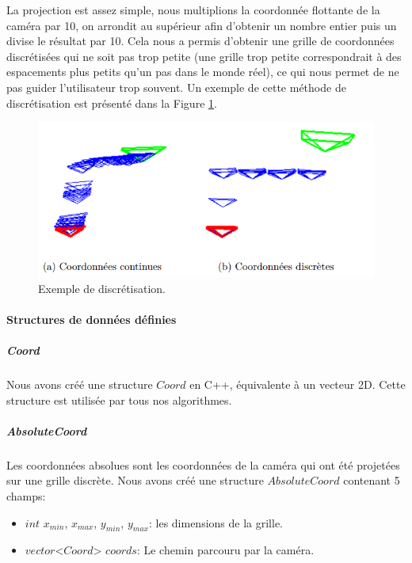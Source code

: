 \documentclass[11pt]{article}
\begin{document}
         La projection est assez simple, nous multiplions la coordonnée flottante de la caméra par 10, on arrondit au supérieur afin d'obtenir
         un nombre entier puis un divise le résultat par 10. Cela nous a permis d'obtenir une grille de coordonnées discrétisées qui ne soit
         pas trop petite (une grille trop petite correspondrait à des espacements plus petits qu'un pas dans le monde réel), ce qui nous permet
         de ne pas guider l'utilisateur trop souvent. Un exemple de cette méthode de discrétisation est présenté dans la Figure 
         \ref{fig:Coordonnees}.

         \begin{figure}[hbt]  
          \includegraphics[width=\textwidth]{Coordonnees.png}    
          \caption{Exemple de discrétisation.}
          \label{fig:Coordonnees}
        \end{figure}  
        
        \pagebreak

        \paragraph{Structures de données définies}

          \subparagraph{Coord}
            Nous avons créé une structure $Coord$ en C++, équivalente à un vecteur 2D. Cette structure est utilisée par tous nos algorithmes.
            
          \subparagraph{AbsoluteCoord}
            Les coordonnées absolues sont les coordonnées de la caméra qui ont été projetées sur une grille discrète. Nous avons créé une 
            structure $AbsoluteCoord$ contenant 5 champs:

            \begin{itemize}
              \item $int$ $x_{min}$, $x_{max}$, $y_{min}$, $y_{max}$: les dimensions de la grille.
              \item $vector$<$Coord$> $coords$: Le chemin parcouru par la caméra.          
            \end{itemize}    
\end{document}
